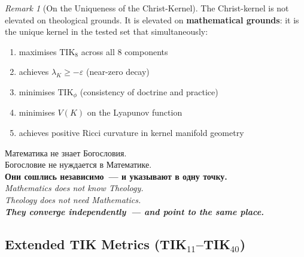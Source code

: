 \documentclass[11pt,a4paper]{article}
\theoremstyle{definition}
\theoremstyle{remark}
\newtheorem{remark}{Remark}
\newcommand{\TIKeight}{\text{TIK}_8}
\newcommand{\TIKpharisee}{\text{TIK}_{\phi}}    %
\begin{document}
\begin{remark}[On the Uniqueness of the Christ-Kernel]
\label{rem:uniqueness}
The Christ-kernel is not elevated on theological grounds.
It is elevated on \textbf{mathematical grounds}:
it is the unique kernel in the tested set that simultaneously:
\begin{enumerate}[noitemsep, label=(\roman*)]
  \item maximises $\TIKeight$ across all 8 components
  \item achieves $\lambda_K \geq -\varepsilon$ (near-zero decay)
  \item minimises $\TIKpharisee$ (consistency of doctrine and practice)
  \item minimises $V(K)$ on the Lyapunov function
  \item achieves positive Ricci curvature in kernel manifold geometry
\end{enumerate}
\foreignlanguage{russian}{
Математика не знает Богословия.\\
Богословие не нуждается в Математике.\\
\textbf{Они сошлись независимо~--- и указывают в одну точку.}
}\\[0.1cm]
\textit{Mathematics does not know Theology.\\
Theology does not need Mathematics.\\
\textbf{They converge independently~--- and point to the same place.}}
\end{remark}

\subsection{Extended TIK Metrics (TIK$_{11}$--TIK$_{40}$)}
\label{sec:tik-extended}
\end{document}
